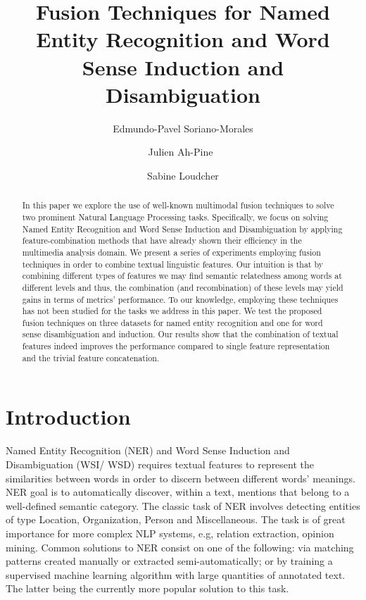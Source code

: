 \documentclass{llncs}
\title{Fusion Techniques for Named Entity Recognition and Word Sense Induction and Disambiguation}
\author{Edmundo-Pavel Soriano-Morales \and Julien Ah-Pine\
 \and Sabine Loudcher}
\institute{University of Lyon, Universit\`{e} Lyon 2, Laboratoire ERIC, Lyon, France,\\
\email{\{edmundo.soriano-morales, julien.ah-pine, sabine.loudcher\}@univ-lyon2.fr}}
\date{}
\begin{document}
\maketitle
\begin{abstract}
In this paper we explore the use of well-known multimodal fusion techniques to solve two prominent Natural Language Processing tasks. Specifically, we focus on solving Named Entity Recognition and Word Sense Induction and Disambiguation by applying feature-combination methods that have already shown their efficiency in the multimedia analysis domain. We present a series of experiments employing fusion techniques in order to combine textual linguistic features. Our intuition is that by combining different types of features we may find semantic relatedness among words at different levels and thus, the combination (and recombination) of these levels may yield gains in terms of metrics' performance. To our knowledge, employing these techniques has not been studied for the tasks we address in this paper. 
We test the proposed fusion techniques on three datasets for named entity recognition and one for word sense disambiguation and induction. Our results show that the combination of textual features indeed improves the performance compared to single feature representation and the trivial feature concatenation.
\end{abstract}


\section{Introduction}

Named Entity Recognition (NER) and Word Sense Induction and Disambiguation (WSI/ \allowbreak WSD) requires textual features to represent the similarities between words in order to discern between different words' meanings. NER goal is to automatically discover, within a text, mentions that belong to a well-defined semantic category. The classic task of NER involves detecting entities of type Location, Organization, Person and Miscellaneous. The task is of great importance for more complex NLP systems, e.g, relation extraction, opinion mining. Common solutions to NER consist on one of the following: via matching patterns created manually or extracted semi-automatically; or by training a supervised machine learning algorithm with large quantities of annotated text. The latter being the currently more popular solution to this task.




\end{document}
